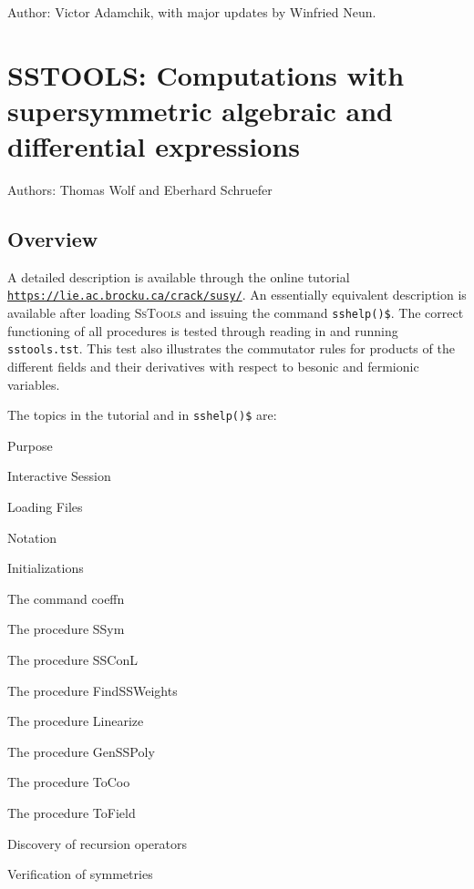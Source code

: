 Author: Victor Adamchik, with major updates by Winfried Neun.



\newpage

\section{SSTOOLS: Computations with supersymmetric algebraic and differential
expressions}


Authors: Thomas Wolf and Eberhard Schruefer


\subsection{Overview}
A detailed description is available through the online tutorial \\
\texttt{\url{https://lie.ac.brocku.ca/crack/susy/}}. An essentially equivalent 
description is available after loading \textsc{SsTools} and issuing the command
\texttt{sshelp()\$}. The correct functioning of all procedures is tested through
reading in and running \texttt{sstools.tst}. This test also illustrates
the commutator rules for products of the different fields and their
derivatives with respect to besonic and fermionic variables.

The topics in the tutorial and in \texttt{sshelp()\$} are:
\begin{description} 
\item{Purpose}
\item{Interactive Session}
\item{Loading Files}
\item{Notation}
\item{Initializations}
\item{The command coeffn}
\item{The procedure SSym}
\item{The procedure SSConL}
\item{The procedure FindSSWeights}
\item{The procedure Linearize}
\item{The procedure GenSSPoly}
\item{The procedure ToCoo}
\item{The procedure ToField}
\item{Discovery of recursion operators}
\item{Verification of symmetries}
\end{description}



